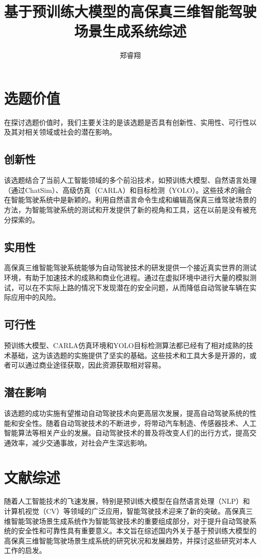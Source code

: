 \documentclass{article}
\title{基于预训练大模型的高保真三维智能驾驶场景生成系统综述}
\author{郑睿翔}
\begin{document}
\section*{选题价值}

在探讨选题价值时，我们主要关注的是该选题是否具有创新性、实用性、可行性以及其对相关领域或社会的潜在影响。

\subsection*{创新性}
该选题结合了当前人工智能领域的多个前沿技术，如预训练大模型、自然语言处理（通过ChatSim）、高级仿真（CARLA）和目标检测（YOLO）。这些技术的融合在智能驾驶系统中是新颖的。利用自然语言命令生成和编辑高保真三维驾驶场景的方法，为智能驾驶系统的测试和开发提供了新的视角和工具，这在以前是没有被充分探索的。

\subsection*{实用性}
高保真三维智能驾驶系统能够为自动驾驶技术的研发提供一个接近真实世界的测试环境，有助于加速技术的成熟和商业化进程。通过在虚拟环境中进行大量的模拟测试，可以在不实际上路的情况下发现潜在的安全问题，从而降低自动驾驶车辆在实际应用中的风险。

\subsection*{可行性}
预训练大模型、CARLA仿真环境和YOLO目标检测算法都已经有了相对成熟的技术基础，这为该选题的实施提供了坚实的基础。这些技术和工具大多是开源的，或者可以通过商业途径获取，因此资源获取相对容易。

\subsection*{潜在影响}
该选题的成功实施有望推动自动驾驶技术向更高层次发展，提高自动驾驶系统的性能和安全性。随着自动驾驶技术的不断进步，将带动汽车制造、传感器技术、人工智能算法等相关产业的发展。自动驾驶技术的普及将改变人们的出行方式，提高交通效率，减少交通事故，对社会产生深远影响。


\section{文献综述}
随着人工智能技术的飞速发展，特别是预训练大模型在自然语言处理（NLP）和计算机视觉（CV）等领域的广泛应用，智能驾驶技术迎来了新的突破。高保真三维智能驾驶场景生成系统作为智能驾驶技术的重要组成部分，对于提升自动驾驶系统的安全性和可靠性具有重要意义。本文旨在综述国内外关于基于预训练大模型的高保真三维智能驾驶场景生成系统的研究状况和发展趋势，并探讨这些研究对本人工作的启发。
\end{document}
